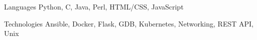 

\begin{cvskills}

  \cvskill
    {Languages} %
    {Python, C, Java, Perl, HTML/CSS, JavaScript} %

  \cvskill
    {Technologies} %
    {Ansible, Docker, Flask, GDB, Kubernetes, Networking, REST API, Unix} %

\end{cvskills}

